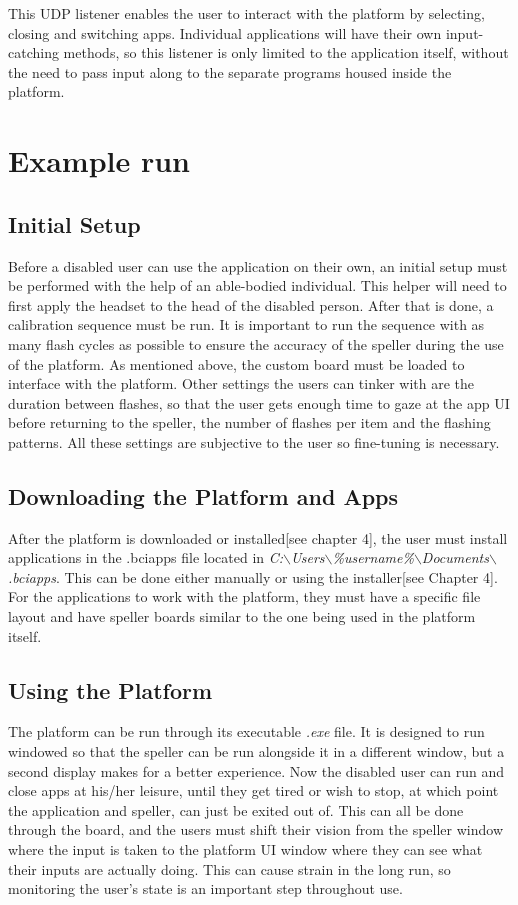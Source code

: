This UDP listener enables the user to interact with the platform by selecting, closing and switching apps. Individual applications will have their own input-catching methods, so this listener is only limited to the application itself, without the need to pass input along to the separate programs housed inside the platform.

\section{Example run}
\subsection{Initial Setup}
Before a disabled user can use the application on their own, an initial setup must be performed with the help of an able-bodied individual. This helper will need to first apply the headset to the head of the disabled person. After that is done, a calibration sequence must be run. It is important to run the sequence with as many flash cycles as possible to ensure the accuracy of the speller during the use of the platform. As mentioned above, the custom board must be loaded to interface with the platform. Other settings the users can tinker with are the duration between flashes, so that the user gets enough time to gaze at the app UI before returning to the speller, the number of flashes per item and the flashing patterns. All these settings are subjective to the user so fine-tuning is necessary.
\subsection{Downloading the Platform and Apps}
After the platform is downloaded or installed[see chapter 4], the user must install applications in the .bciapps file located in \textit{C:$\backslash$Users$\backslash$\%username\%$\backslash$Documents$\backslash$.bciapps}. This can be done either manually or using the installer[see Chapter 4]. For the applications to work with the platform, they must have a specific file layout and have speller boards similar to the one being used in the platform itself.
\subsection{Using the Platform}
The platform can be run through its executable \textit{.exe} file. It is designed to run windowed so that the speller can be run alongside it in a different window, but a second display makes for a better experience. Now the disabled user can run and close apps at his/her leisure, until they get tired or wish to stop, at which point the application and speller, can just be exited out of. This can all be done through the board, and the users must shift their vision from the speller window where the input is taken to the platform UI window where they can see what their inputs are actually doing. This can cause strain in the long run, so monitoring the user's state is an important step throughout use.

